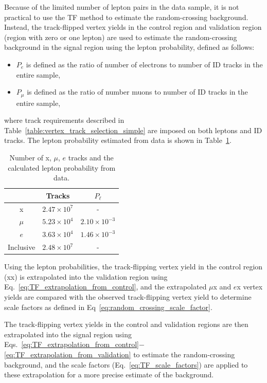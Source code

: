 Because of the limited number of lepton pairs in the data sample, it is not practical to use the TF method to estimate the random-crossing background. Instead, the track-flipped vertex yields in the control region and validation region (region with zero or one lepton) are used to estimate the random-crossing background in the signal region using the lepton probability, defined as follows:
\begin{itemize}
\item $P_{e}$ is defined as the ratio of number of electrons to number of ID tracks in the entire sample,
\item $P_{\mu}$ is defined as the ratio of number muons to number of ID tracks in the entire sample,
\end{itemize}
where track requirements described in Table~\ref{table:vertex_track_selection_simple} are imposed on both leptons and ID tracks. The lepton probability estimated from data is shown in Table~\ref{table:lepton_probability}.

\begin{table}[!htb]%
  \centering
    \begin{tabular}[t]{ccc}
        \hline\hline
                & Tracks             & $P_{\ell}$           \\
         \hline
         x      & $2.47\times10^{7}$ & -                   \\
         $\mu$  & $5.23\times10^{4}$ & $2.10\times10^{-3}$ \\
         $e$    & $3.63\times10^{4}$ & $1.46\times10^{-3}$ \\
         \hline
         Inclusive    & $2.48\times10^{7}$ & - \\
        \hline\hline
    \end{tabular}
  \caption{Number of x, $\mu$, $e$ tracks and the calculated lepton probability from data.}%
  \label{table:lepton_probability}
\end{table}


Using the lepton probabilities, the track-flipping vertex yield in the control region (xx) is extrapolated into the validation region using Eq.~\ref{eq:TF_extrapolation_from_control}, and the extrapolated $\mu$x and $e$x vertex yields are compared with the observed track-flipping vertex yield to determine scale factors as defined in Eq~\ref{eq:random_crossing_scale_factor}.

The track-flipping vertex yields in the control and validation regions are then extrapolated into the signal region using Eqs.~\ref{eq:TF_extrapolation_from_control}$-$\ref{eq:TF_extrapolation_from_validation} to estimate the random-crossing background, and the scale factors (Eq.~\ref{eq:TF_scale_factors}) are applied to these extrapolation for a more precise estimate of the background.


